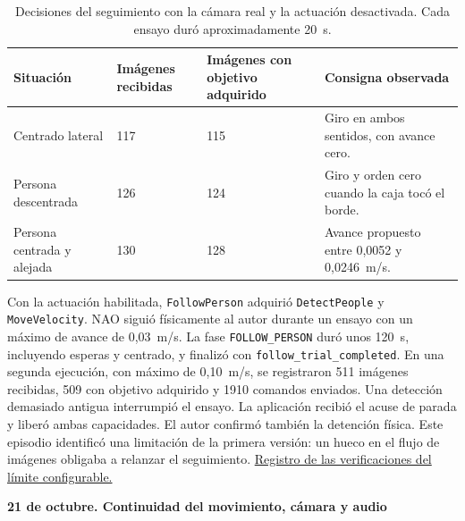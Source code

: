 \documentclass[11pt,letterpaper]{article}
\newcommand{\code}[1]{\nolinkurl{#1}}
\begin{document}
\begin{table}[htbp]
\centering\small
\caption{Decisiones del seguimiento con la cámara real y la actuación desactivada. Cada ensayo duró aproximadamente 20~s.}\label{tab:previaoctubre}
\begin{tabularx}{\textwidth}{P{3.4cm}P{2.35cm}P{2.35cm}Y}
\toprule
Situación & Imágenes recibidas & Imágenes con objetivo adquirido & Consigna observada \\
\midrule
Centrado lateral & 117 & 115 & Giro en ambos sentidos, con avance cero. \\
Persona descentrada & 126 & 124 & Giro y orden cero cuando la caja tocó el borde. \\
Persona centrada y alejada & 130 & 128 & Avance propuesto entre 0,0052 y 0,0246~m/s. \\
\bottomrule
\end{tabularx}
\end{table}

Con la actuación habilitada, \code{FollowPerson} adquirió \code{DetectPeople} y \code{MoveVelocity}. NAO siguió físicamente al autor durante un ensayo con un máximo de avance de 0,03~m/s. La fase \code{FOLLOW_PERSON} duró unos 120~s, incluyendo esperas y centrado, y finalizó con \code{follow_trial_completed}. En una segunda ejecución, con máximo de 0,10~m/s, se registraron 511 imágenes recibidas, 509 con objetivo adquirido y 1910 comandos enviados. Una detección demasiado antigua interrumpió el ensayo. La aplicación recibió el acuse de parada y liberó ambas capacidades. El autor confirmó también la detención física. Este episodio identificó una limitación de la primera versión: un hueco en el flujo de imágenes obligaba a relanzar el seguimiento. \href{https://github.com/jumafe1/portable-hri-reference-system/blob/c64fee01ad49eac5c0b64dc76c94f026dcfef0e9/results/follow_person_speed_20261019.json}{Registro de las verificaciones del límite configurable.}

\par\medskip\noindent\textbf{21 de octubre. Continuidad del movimiento, cámara y audio}\par
\end{document}
